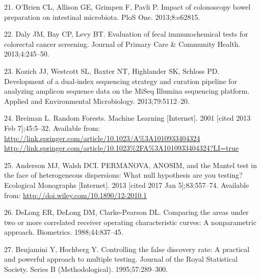 \documentclass[12pt,]{article}
\begin{document}
\hypertarget{ref-obrien_impact_2013}{}
21. O'Brien CL, Allison GE, Grimpen F, Pavli P. Impact of colonoscopy
bowel preparation on intestinal microbiota. PloS One. 2013;8:e62815.

\hypertarget{ref-daly_evaluation_2013}{}
22. Daly JM, Bay CP, Levy BT. Evaluation of fecal immunochemical tests
for colorectal cancer screening. Journal of Primary Care \& Community
Health. 2013;4:245--50.

\hypertarget{ref-kozich_development_2013}{}
23. Kozich JJ, Westcott SL, Baxter NT, Highlander SK, Schloss PD.
Development of a dual-index sequencing strategy and curation pipeline
for analyzing amplicon sequence data on the MiSeq Illumina sequencing
platform. Applied and Environmental Microbiology. 2013;79:5112--20.

\hypertarget{ref-breiman_random_2001}{}
24. Breiman L. Random Forests. Machine Learning {[}Internet{]}. 2001
{[}cited 2013 Feb 7{]};45:5--32. Available from:
\href{http://link.springer.com/article/10.1023/A\%3A1010933404324\%20http://link.springer.com/article/10.1023\%2FA\%3A1010933404324?LI=true}{http://link.springer.com/article/10.1023/A\%3A1010933404324 http://link.springer.com/article/10.1023\%2FA\%3A1010933404324?LI=true}

\hypertarget{ref-anderson_permanova_2013}{}
25. Anderson MJ, Walsh DCI. PERMANOVA, ANOSIM, and the Mantel test in
the face of heterogeneous dispersions: What null hypothesis are you
testing? Ecological Monographs {[}Internet{]}. 2013 {[}cited 2017 Jan
5{]};83:557--74. Available from:
\url{http://doi.wiley.com/10.1890/12-2010.1}

\hypertarget{ref-delong_comparing_1988}{}
26. DeLong ER, DeLong DM, Clarke-Pearson DL. Comparing the areas under
two or more correlated receiver operating characteristic curves: A
nonparametric approach. Biometrics. 1988;44:837--45.

\hypertarget{ref-benjamini_controlling_1995}{}
27. Benjamini Y, Hochberg Y. Controlling the false discovery rate: A
practical and powerful approach to multiple testing. Journal of the
Royal Statistical Society. Series B (Methodological). 1995;57:289--300.
\end{document}
